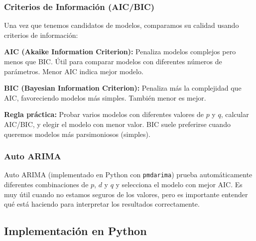 \documentclass[12pt]{article}
\begin{document}
\subsubsection{Criterios de Información (AIC/BIC)}

Una vez que tenemos candidatos de modelos, comparamos su calidad usando criterios de información:

\vspace{0.5em}

\textbf{AIC (Akaike Information Criterion):} Penaliza modelos complejos pero menos que BIC. Útil para comparar modelos con diferentes números de parámetros. Menor AIC indica mejor modelo.

\vspace{0.5em}

\textbf{BIC (Bayesian Information Criterion):} Penaliza más la complejidad que AIC, favoreciendo modelos más simples. También menor es mejor.

\vspace{0.5em}

\textbf{Regla práctica:} Probar varios modelos con diferentes valores de $p$ y $q$, calcular AIC/BIC, y elegir el modelo con menor valor. BIC suele preferirse cuando queremos modelos más parsimoniosos (simples).

\subsubsection{Auto ARIMA}

Auto ARIMA (implementado en Python con \texttt{pmdarima}) prueba automáticamente diferentes combinaciones de $p$, $d$ y $q$ y selecciona el modelo con mejor AIC. Es muy útil cuando no estamos seguros de los valores, pero es importante entender qué está haciendo para interpretar los resultados correctamente.

\subsection{Implementación en Python}
\end{document}

